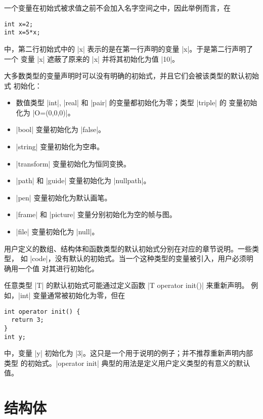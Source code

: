 \documentclass{ctexbook}
\begin{document}
一个变量在初始式被求值之前不会加入名字空间之中，因此举例而言，在
\begin{lstlisting}
int x=2;
int x=5*x;
\end{lstlisting}
中，第二行初始式中的 |x| 表示的是在第一行声明的变量 |x|。于是第二行声明了一个
变量 |x| 遮蔽了原来的 |x| 并将其初始化为值 |10|。

大多数类型的变量声明时可以没有明确的初始式，并且它们会被该类型的默认初始式
初始化：
\begin{itemize}
  \item 数值类型 |int|, |real| 和 |pair| 的变量都初始化为零；类型 |triple| 的
    变量初始化为 |O=(0,0,0)|。
  \item |bool| 变量初始化为 |false|。
  \item |string| 变量初始化为空串。
  \item |transform| 变量初始化为恒同变换。
  \item |path| 和 |guide| 变量初始化为 |nullpath|。
  \item |pen| 变量初始化为默认画笔。
  \item |frame| 和 |picture| 变量分别初始化为空的帧与图。
  \item |file| 变量初始化为 |null|。
\end{itemize}

用户定义的数组、结构体和函数类型的默认初始式分别在对应的章节说明。一些类型，
如 |code|，没有默认的初始式。当一个这种类型的变量被引入，用户必须明确用一个值
对其进行初始化。

任意类型 |T| 的默认初始式可能通过定义函数 |T operator init()| 来重新声明。
例如，|int| 变量通常被初始化为零，但在
\begin{lstlisting}
int operator init() {
  return 3;
}
int y;
\end{lstlisting}
中，变量 |y| 初始化为 |3|。这只是一个用于说明的例子；并不推荐重新声明内部类型
的初始式。|operator init| 典型的用法是定义用户定义类型的有意义的默认值。



\section{结构体}
\label{sec:structures}
\end{document}

